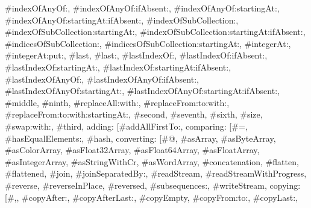 {\textquotedbl{}\#indexOfAnyOf:\textquotedbl{}, \textquotedbl{}\#indexOfAnyOf:ifAbsent:\textquotedbl{}, \textquotedbl{}\#indexOfAnyOf:startingAt:\textquotedbl{}, \textquotedbl{}\#indexOfAnyOf:startingAt:ifAbsent:\textquotedbl{}, \textquotedbl{}\#indexOfSubCollection:\textquotedbl{}, \textquotedbl{}\#indexOfSubCollection:startingAt:\textquotedbl{}, \textquotedbl{}\#indexOfSubCollection:startingAt:ifAbsent:\textquotedbl{}, \textquotedbl{}\#indicesOfSubCollection:\textquotedbl{}, \textquotedbl{}\#indicesOfSubCollection:startingAt:\textquotedbl{}, \textquotedbl{}\#integerAt:\textquotedbl{}, \textquotedbl{}\#integerAt:put:\textquotedbl{}, \textquotedbl{}\#last\textquotedbl{}, \textquotedbl{}\#last:\textquotedbl{}, \textquotedbl{}\#lastIndexOf:\textquotedbl{}, \textquotedbl{}\#lastIndexOf:ifAbsent:\textquotedbl{}, \textquotedbl{}\#lastIndexOf:startingAt:\textquotedbl{}, \textquotedbl{}\#lastIndexOf:startingAt:ifAbsent:\textquotedbl{}, \textquotedbl{}\#lastIndexOfAnyOf:\textquotedbl{}, \textquotedbl{}\#lastIndexOfAnyOf:ifAbsent:\textquotedbl{}, \textquotedbl{}\#lastIndexOfAnyOf:startingAt:\textquotedbl{}, \textquotedbl{}\#lastIndexOfAnyOf:startingAt:ifAbsent:\textquotedbl{}, \textquotedbl{}\#middle\textquotedbl{}, \textquotedbl{}\#ninth\textquotedbl{}, \textquotedbl{}\#replaceAll:with:\textquotedbl{}, \textquotedbl{}\#replaceFrom:to:with:\textquotedbl{}, \textquotedbl{}\#replaceFrom:to:with:startingAt:\textquotedbl{}, \textquotedbl{}\#second\textquotedbl{}, \textquotedbl{}\#seventh\textquotedbl{}, \textquotedbl{}\#sixth\textquotedbl{}, \textquotedbl{}\#size\textquotedbl{}, \textquotedbl{}\#swap:with:\textquotedbl{}, \textquotedbl{}\#third\textquotedbl{}{]}, \textquotedbl{}adding\textquotedbl{}: {[}\textquotedbl{}\#addAllFirstTo:\textquotedbl{}{]}, \textquotedbl{}comparing\textquotedbl{}: {[}\textquotedbl{}\#=\textquotedbl{}, \textquotedbl{}\#hasEqualElements:\textquotedbl{}, \textquotedbl{}\#hash\textquotedbl{}{]}, \textquotedbl{}converting\textquotedbl{}: {[}\textquotedbl{}\#@\textquotedbl{}, \textquotedbl{}\#asArray\textquotedbl{}, \textquotedbl{}\#asByteArray\textquotedbl{}, \textquotedbl{}\#asColorArray\textquotedbl{}, \textquotedbl{}\#asFloat32Array\textquotedbl{}, \textquotedbl{}\#asFloat64Array\textquotedbl{}, \textquotedbl{}\#asFloatArray\textquotedbl{}, \textquotedbl{}\#asIntegerArray\textquotedbl{}, \textquotedbl{}\#asStringWithCr\textquotedbl{}, \textquotedbl{}\#asWordArray\textquotedbl{}, \textquotedbl{}\#concatenation\textquotedbl{}, \textquotedbl{}\#flatten\textquotedbl{}, \textquotedbl{}\#flattened\textquotedbl{}, \textquotedbl{}\#join\textquotedbl{}, \textquotedbl{}\#joinSeparatedBy:\textquotedbl{}, \textquotedbl{}\#readStream\textquotedbl{}, \textquotedbl{}\#readStreamWithProgress\textquotedbl{}, \textquotedbl{}\#reverse\textquotedbl{}, \textquotedbl{}\#reverseInPlace\textquotedbl{}, \textquotedbl{}\#reversed\textquotedbl{}, \textquotedbl{}\#subsequences:\textquotedbl{}, \textquotedbl{}\#writeStream\textquotedbl{}{]}, \textquotedbl{}copying\textquotedbl{}: {[}\textquotedbl{}\#,\textquotedbl{}, \textquotedbl{}\#copyAfter:\textquotedbl{}, \textquotedbl{}\#copyAfterLast:\textquotedbl{}, \textquotedbl{}\#copyEmpty\textquotedbl{}, \textquotedbl{}\#copyFrom:to:\textquotedbl{}, \textquotedbl{}\#copyLast:\textquotedbl{}, }

